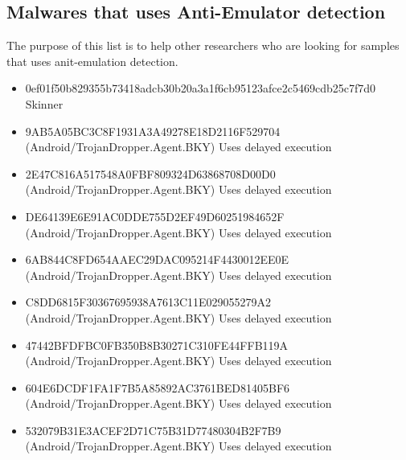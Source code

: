 \documentclass[../main.tex]{subfile}
\begin{document}
\begin{appendices}
		\section{Malwares that uses Anti-Emulator detection}
	The purpose of this list is to help other researchers who are looking for samples that uses anit-emulation detection.
	\begin{itemize}
		\item 0ef01f50b829355b73418adcb30b20a3a1f6cb95123afce2c5469cdb25c7f7d0 Skinner
		\item 9AB5A05BC3C8F1931A3A49278E18D2116F529704 (Android/TrojanDropper.Agent.BKY) Uses delayed execution \cite{eset_multi_stage_malware}
		\item 2E47C816A517548A0FBF809324D63868708D00D0 (Android/TrojanDropper.Agent.BKY) Uses delayed execution \cite{eset_multi_stage_malware}
		\item DE64139E6E91AC0DDE755D2EF49D60251984652F (Android/TrojanDropper.Agent.BKY) Uses delayed execution \cite{eset_multi_stage_malware}
		\item 6AB844C8FD654AAEC29DAC095214F4430012EE0E (Android/TrojanDropper.Agent.BKY) Uses delayed execution \cite{eset_multi_stage_malware}
		\item C8DD6815F30367695938A7613C11E029055279A2 (Android/TrojanDropper.Agent.BKY) Uses delayed execution \cite{eset_multi_stage_malware}
		\item 47442BFDFBC0FB350B8B30271C310FE44FFB119A (Android/TrojanDropper.Agent.BKY) Uses delayed execution \cite{eset_multi_stage_malware}
		\item 604E6DCDF1FA1F7B5A85892AC3761BED81405BF6 (Android/TrojanDropper.Agent.BKY) Uses delayed execution \cite{eset_multi_stage_malware}
		\item 532079B31E3ACEF2D71C75B31D77480304B2F7B9 (Android/TrojanDropper.Agent.BKY) Uses delayed execution \cite{eset_multi_stage_malware}
	\end{itemize}
	
	\end{appendices}
\end{document}
